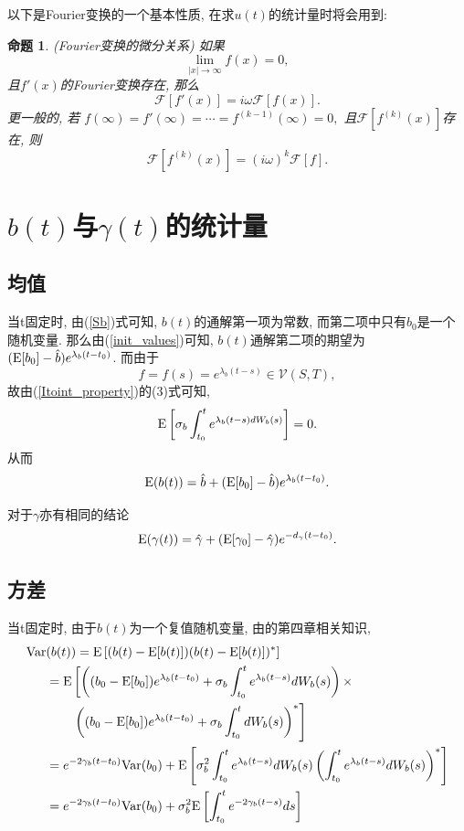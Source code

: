 \documentclass[notitlepage,cs4size,punct,oneside]{ctexrep}
\numberwithin{equation}{section}
\theoremstyle{mystyle}
\newtheorem{proposition}[definition]{\hspace{2em}命题}
\begin{document}
以下是Fourier变换的一个基本性质, 在求$u(t)$的统计量时将会用到:
\begin{proposition}(Fourier变换的微分关系) \label{Fourier transform property 1}
如果
$$\lim_{|x|\to\infty} f(x) = 0,$$
且$f'(x)$的Fourier变换存在, 那么
$$\mathcal{F}[f'(x)] = i\omega\mathcal{F}[f(x)].$$
更一般的, 若
$f(\infty) = f'(\infty) = \cdots = f^{(k-1)}(\infty) = 0,$ 且$\mathcal{F}[f^{(k)}(x)]$存在, 则
$$\mathcal{F}[f^{(k)}(x)] = (i\omega)^k \mathcal{F}[f].$$
\end{proposition}

\section{$b(t)$与$\gamma(t)$的统计量}
\subsection{均值}
当t固定时, 由(\ref{Sb})式可知, $b(t)$的通解第一项为常数, 而第二项中只有$b_0$是一个随机变量. 那么由(\ref{init_values})可知, $b(t)$通解第二项的期望为$(\text{E}[b_0]-\hat{b})e^{\lambda_b(t-t_0)}$. 而由于
$$f = f(s) = e^{\lambda_b(t-s)}\in\mathcal{V}(S, T),$$
故由(\ref{Itoint_property})的(3)式可知,
$$\text{E}\left[\sigma_b\int_{t_0}^{t} e^{\lambda_b(t-s)dW_b(s)}\right] = 0.$$
从而
\begin{equation} \label{b_stat_1}
\text{E}(b(t)) = \hat{b} + (\text{E}[b_0] - \hat{b})e^{\lambda_b(t-t_0)}.
\end{equation}

对于$\gamma$亦有相同的结论
\begin{equation} \label{gamma_stat_1}
\text{E}(\gamma(t)) = \hat{\gamma} + (\text{E}[\gamma_0] - \hat{\gamma})e^{-d_{\gamma}(t-t_0)}.
\end{equation}

\subsection{方差}
当t固定时, 由于$b(t)$为一个复值随机变量, 由\cite{shuyuanhe2006probability}的第四章相关知识,
\begin{equation} \label{b_stat_2_process}
\begin{split}
\text{Var}&(b(t)) = \text{E}\left[(b(t)-\text{E}[b(t)])(b(t)-\text{E}[b(t)])^*\right] \\
&= \text{E}\left[\left((b_0-\text{E}[b_0])e^{\lambda_b(t-t_0)}+\sigma_b\int_{t_0}^t e^{\lambda_b(t-s)}dW_b(s)\right)\times\right. \\
&\quad\quad\left.\left((b_0-\text{E}[b_0])e^{\lambda_b(t-t_0)}+\sigma_b\int_{t_0}^t dW_b(s) \right)^*\right] \\ 
&= e^{-2\gamma_b(t-t_0)}\text{Var}(b_0) + \text{E}\left[\sigma_b^2\int_{t_0}^t e^{\lambda_b(t-s)}dW_b(s)\left(\int_{t_0}^t e^{\lambda_b(t-s)}dW_b(s)\right)^*\right] \\
&= e^{-2\gamma_b(t-t_0)}\text{Var}(b_0) + \sigma_b^2\text{E}\left[\int_{t_0}^t e^{-2\gamma_b(t-s)}ds\right] \\
\end{split}
\end{equation}
\end{document}
